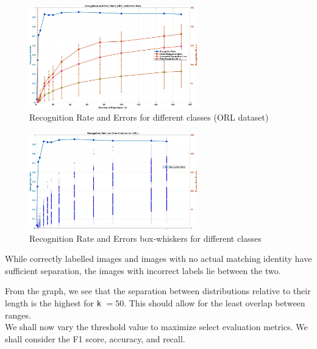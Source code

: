 \documentclass{article}
\begin{document}
\begin{figure}[!htb]
    \centering
    \includegraphics[width=0.65\textwidth]{simple_plot.jpg}
    \caption{Recognition Rate and Errors for different classes (ORL dataset)}
\end{figure}
\begin{figure}[!htb]
    \centering
    \includegraphics[width=0.65\textwidth]{box_plot.jpg}
    \caption{Recognition Rate and Errors box-whiskers for different classes}
\end{figure}

While correctly labelled images and images with no actual matching identity have sufficient separation, the images with incorrect labels lie between the two. 

From the graph, we see that the separation between distributions relative to their length is the highest for \texttt{k} $= 50$. This should allow for the least overlap between ranges. 
\\
We shall now vary the threshold value to maximize select evaluation metrics. We shall consider the F1 score, accuracy, and recall.
\end{document}

